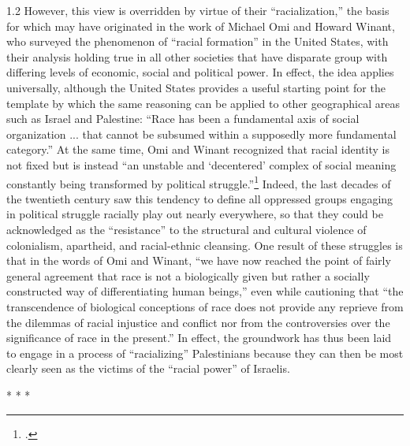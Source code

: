 \documentclass[../unravbook.tex]{subfiles}
\begin{document}
\begin{spacing}{1.2}
However, this view is overridden by virtue of their ``racialization,'' the basis for which may have originated in the work of Michael Omi and Howard Winant, who surveyed the phenomenon of ``racial formation'' in the United States, with their analysis holding true in all other societies that have disparate group with differing levels of economic, social and political power. In effect, the idea applies universally, although the United States provides a useful starting point for the template by which the same reasoning can be applied to other geographical areas such as Israel and Palestine: ``Race has been a fundamental axis of social organization ... that cannot be subsumed within a supposedly more fundamental category.'' At the same time, Omi and Winant recognized that racial identity is not fixed but is instead ``an unstable and `decentered' complex of social meaning constantly being transformed by political struggle.''\footcite[][p.13]{Omi-Winant-1994} Indeed, the last decades of the twentieth century saw this tendency to define all oppressed groups engaging in political struggle racially play out nearly everywhere, so that they could be acknowledged as the ``resistance'' to the structural and cultural violence of colonialism, apartheid, and racial-ethnic cleansing. One result of these struggles is that in the words of Omi and Winant, ``we have now reached the point of fairly general agreement that race is not a biologically given but rather a socially constructed way of differentiating human beings,'' even while cautioning that ``the transcendence of biological conceptions of race does not provide any reprieve from the dilemmas of racial injustice and conflict nor from the controversies over the significance of race in the present.'' In effect, the groundwork has thus been laid to engage in a process of ``racializing'' Palestinians because they can then be most clearly seen as the victims of the ``racial power'' of Israelis.  

\begin{center}
    *\hspace{15pt} *\hspace{15pt} *
  \end{center}


\end{spacing}
\end{document}
